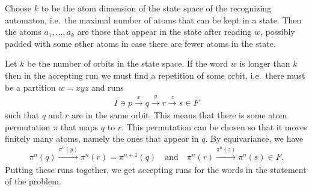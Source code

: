 {
    Choose $k$ to be the atom dimension of the state space of the recognizing automaton, i.e.~the maximal number of atoms that can be kept in a state. Then the atoms $a_1,\ldots,a_k$ are those that appear in the state after reading $w$, possibly padded with some other atoms in case there are fewer atoms in the state. 
}


{
    Let $k$ be the number of orbits in the state space.  If the word $w$ is longer than $k$ then in the accepting run we must find a repetition of some orbit, i.e.~there must be a partition $w = xyz$ and runs 
    \begin{align*}
    I \ni p \stackrel x \to 
    q \stackrel y \to
    r \stackrel z \to
    s \in F
    \end{align*}
    such that $q$ and $r$ are in the same orbit. This means that there is some atom permutation $\pi$ that maps $q$ to $r$. This permutation can be chosen so that it moves finitely many atoms, namely the ones that appear in $q$. By equivariance, we have 
    \begin{align*}
        \pi^{n}(q) \stackrel {\pi^n(y)} \to \pi^{n}(r) = \pi^{n+1}(q)
        \quad \text{and} \quad
        \pi^{n}(r) \stackrel {\pi^n(z)}  \to \pi^{n}(s) \in F.
    \end{align*}
    Putting these runs together, we get accepting runs for the words in the statement of the problem.

}

